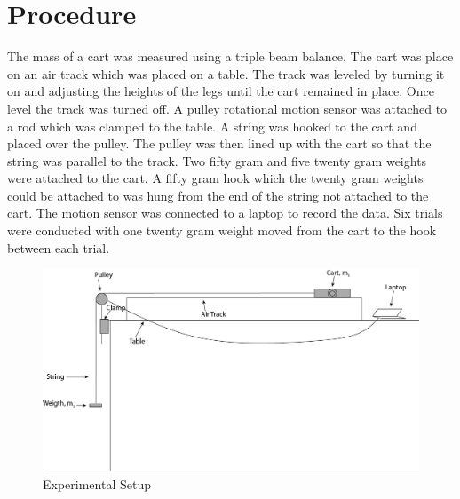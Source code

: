 \documentclass[12pt]{article}
\begin{document}
    \section{Procedure}
        The mass of a cart was measured using a triple beam balance. The cart was place on an air track which was placed on a table. The track was leveled by turning it on and adjusting the heights of the legs until the cart remained in place. Once level the track was turned off. A pulley rotational motion sensor was attached to a rod which was clamped to the table. A string was hooked to the cart and placed over the pulley. The pulley was then lined up with the cart so that the string was parallel to the track. Two fifty gram and five twenty gram weights were attached to the cart. A fifty gram hook which the twenty gram weights could be attached to was hung from the end of the string not attached to the cart. The motion sensor was connected to a laptop to record the data. Six trials were conducted with one twenty gram weight moved from the cart to the hook between each trial.
        \begin{figure}[H]
            \centering
            \includegraphics[width=\linewidth]{Experimental Setup.png}
            \caption{Experimental Setup}
        \end{figure}
\end{document}
